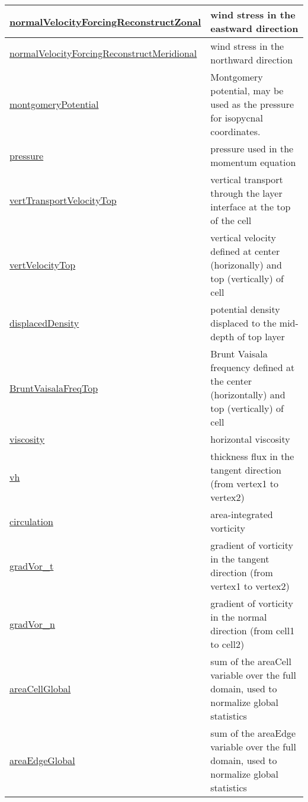{\begin{center}
\begin{longtable}{| p{2.0in} | p{4.0in} |}
	\hline
	\hyperref[subsec:var_sec_state_normalVelocityForcingReconstructZonal]{normalVelocityForcingReconstructZonal} & wind stress in the eastward direction \\
	\hline
	\hyperref[subsec:var_sec_state_normalVelocityForcingReconstructMeridional]{normalVelocityForcingReconstructMeridional} & wind stress in the northward direction \\
	\hline
	\hyperref[subsec:var_sec_state_montgomeryPotential]{montgomeryPotential} & Montgomery potential, may be used as the pressure for isopycnal coordinates. \\
	\hline
	\hyperref[subsec:var_sec_state_pressure]{pressure} & pressure used in the momentum equation \\
	\hline
	\hyperref[subsec:var_sec_state_vertTransportVelocityTop]{vertTransportVelocityTop} & vertical transport through the layer interface at the top of the cell \\
	\hline
	\hyperref[subsec:var_sec_state_vertVelocityTop]{vertVelocityTop} & vertical velocity defined at center (horizonally) and top (vertically) of cell \\
	\hline
	\hyperref[subsec:var_sec_state_displacedDensity]{displacedDensity} & potential density displaced to the mid-depth of top layer \\
	\hline
	\hyperref[subsec:var_sec_state_BruntVaisalaFreqTop]{BruntVaisalaFreqTop} & Brunt Vaisala frequency defined at the center (horizontally) and top (vertically) of cell \\
	\hline
	\hyperref[subsec:var_sec_state_viscosity]{viscosity} & horizontal viscosity \\
	\hline
	\hyperref[subsec:var_sec_state_vh]{vh} & thickness flux in the tangent direction (from vertex1 to vertex2) \\
	\hline
	\hyperref[subsec:var_sec_state_circulation]{circulation} & area-integrated vorticity \\
	\hline
	\hyperref[subsec:var_sec_state_gradVor_t]{gradVor\_t} & gradient of vorticity in the tangent direction (from vertex1 to vertex2) \\
	\hline
	\hyperref[subsec:var_sec_state_gradVor_n]{gradVor\_n} & gradient of vorticity in the normal direction (from cell1 to cell2) \\
	\hline
	\hyperref[subsec:var_sec_state_areaCellGlobal]{areaCellGlobal} & sum of the areaCell variable over the full domain, used to normalize global statistics \\
	\hline
	\hyperref[subsec:var_sec_state_areaEdgeGlobal]{areaEdgeGlobal} & sum of the areaEdge variable over the full domain, used to normalize global statistics \\

\end{longtable}
\end{center}}
